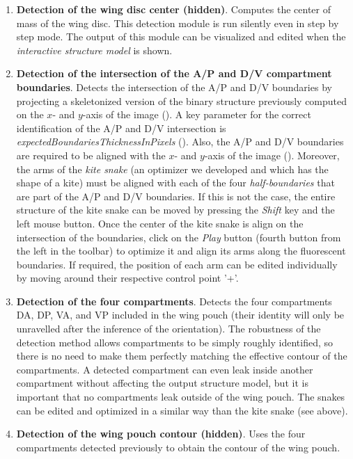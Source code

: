 \begin{enumerate}
 \item \textbf{Detection of the wing disc center (hidden)}. Computes the center of mass of the wing disc. This detection module is run silently even in step by step mode. The output of this module can be visualized and edited when the \emph{interactive structure model} is shown.
 \item \textbf{Detection of the intersection of the A/P and D/V compartment boundaries}. Detects the intersection of the A/P and D/V boundaries by projecting a skeletonized version of the binary structure previously computed on the $x$- and $y$-axis of the image (). A key parameter for the correct identification of the A/P and D/V intersection is \textit{expectedBoundariesThicknessInPixels} (). Also, the A/P and D/V boundaries are required to be aligned with the $x$- and $y$-axis of the image (). Moreover, the arms of the \textit{kite snake} (an optimizer we developed and which has the shape of a kite) must be aligned with each of the four \textit{half-boundaries} that are part of the A/P and D/V boundaries. If this is not the case, the entire structure of the kite snake can be moved by pressing the \emph{Shift} key and the left mouse button. Once the center of the kite snake is align on the intersection of the boundaries, click on the \textit{Play} button (fourth button from the left in the \ij toolbar) to optimize it and align its arms along the fluorescent boundaries. If required, the position of each arm can be edited individually by moving around their respective control point '+'.
 \item \textbf{Detection of the four compartments}. Detects the four compartments DA, DP, VA, and VP included in the wing pouch (their identity will only be unravelled after the inference of the orientation). The robustness of the detection method allows compartments to be simply roughly identified, so there is no need to make them perfectly matching the effective contour of the compartments. A detected compartment can even leak inside another compartment without affecting the output structure model, but it is important that no compartments leak outside of the wing pouch. The snakes can be edited and optimized in a similar way than the kite snake (see above).
 \item \textbf{Detection of the wing pouch contour (hidden)}. Uses the four compartments detected previously to obtain the contour of the wing pouch.

\end{enumerate}
